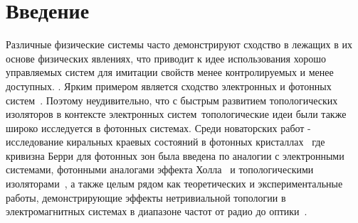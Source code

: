 \documentclass[
aps,
prl,
groupedaddress,
superscriptaddress,
floatfix,
notitlepage
]{revtex4-1}
\begin{document}

{\let\newpage\relax\maketitle}

\section*{Введение}

Различные физические системы часто демонстрируют сходство в лежащих в их основе физических явлениях, что приводит к идее использования хорошо управляемых систем для имитации свойств менее контролируемых и менее доступных. .
Ярким примером является сходство электронных и фотонных систем~\cite{Georgescu2014}.
Поэтому неудивительно, что с быстрым развитием топологических изоляторов в контексте электронных систем~\cite{Kane-Mele,Bernevig,Konig}топологические идеи были
также широко исследуется в фотонных системах. Среди новаторских работ -
исследование киральных краевых состояний в фотонных кристаллах~\cite{Raghu-2008} где кривизна Берри для фотонных зон была введена по аналогии с электронными системами, фотонными аналогами эффекта Холла~\cite{Haldane2008a, Wang2008,Wang-2009} и топологическими изоляторами~\cite{Hafezi-2011,Fang-2012,Rechtsman-2013,Khanikaev2013}, а также целым рядом как теоретических и экспериментальные работы, демонстрирующие эффекты нетривиальной топологии в электромагнитных системах в диапазоне частот от радио до оптики~\cite{Lu-2014}.
\end{document}
